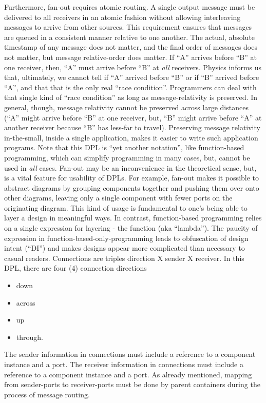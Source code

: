 \documentclass[10pt,anonymous,review]{acmart}
\begin{document}
Furthermore, fan-out requires atomic routing. A single output message must be delivered to all receivers in an atomic fashion without allowing interleaving messages to arrive from other sources. This requirement ensures that messages are queued in a consistent manner relative to one another. The actual, absolute timestamp of any message does not matter, and the final order of messages does not matter, but message relative-order does matter. If “A” arrives before “B” at one receiver, then, “A” must arrive before “B” at \emph{all} receivers. Physics informs us that, ultimately, we cannot tell if “A” arrived before “B” or if “B” arrived before “A”, and that that is the only real “race condition”. Programmers can deal with that single kind of “race condition” as long as message-relativity is preserved. In general, though, message relativity cannot be preserved across large distances (“A” might arrive before “B” at one receiver, but, “B” might arrive before “A” at another receiver because “B” has less-far to travel). Preserving message relativity in-the-small, inside a single application, makes it easier to write such application programs. Note that this DPL is “yet another notation”, like function-based programming, which can simplify programming in many cases, but, cannot be used in \emph{all} cases.
Fan-out may be an inconvenience in the theoretical sense, but, is a vital feature for usability of DPLs. For example, fan-out makes it possible to abstract diagrams by grouping components together and pushing them over onto other diagrams, leaving only a single component with fewer ports on the originating diagram. This kind of usage is fundamental to one’s being able to layer a design in meaningful ways. In contrast, function-based programming relies on a single expression for layering - the function (aka “lambda”). The paucity of expression in function-based-only-programming leads to obfuscation of design intent (“DI”) and makes designs appear more complicated than necessary to casual readers.
Connections are triples {direction X sender X receiver}.
In this DPL, there are four (4) connection directions
\begin{itemize}
\item down
\item across
\item up
\item through.
\end{itemize}
The sender information in connections must include a reference to a component instance and a port.
The receiver information in connections must include a reference to a component instance and a port.
As already mentioned, mapping from sender-ports to receiver-ports must be done by parent containers during the process of message routing.
\end{document}
